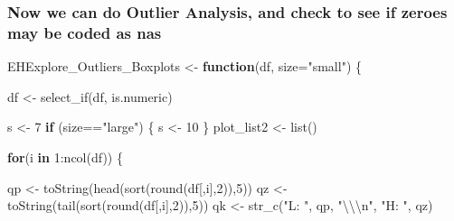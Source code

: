 \documentclass[
]{article}
\newenvironment{Shaded}{\begin{snugshade}}{\end{snugshade}}
\newcommand{\AttributeTok}[1]{\textcolor[rgb]{0.77,0.63,0.00}{#1}}
\newcommand{\ControlFlowTok}[1]{\textcolor[rgb]{0.13,0.29,0.53}{\textbf{#1}}}
\newcommand{\DecValTok}[1]{\textcolor[rgb]{0.00,0.00,0.81}{#1}}
\newcommand{\FunctionTok}[1]{\textcolor[rgb]{0.00,0.00,0.00}{#1}}
\newcommand{\NormalTok}[1]{#1}
\newcommand{\OtherTok}[1]{\textcolor[rgb]{0.56,0.35,0.01}{#1}}
\newcommand{\SpecialCharTok}[1]{\textcolor[rgb]{0.00,0.00,0.00}{#1}}
\newcommand{\StringTok}[1]{\textcolor[rgb]{0.31,0.60,0.02}{#1}}
\begin{document}
\hypertarget{now-we-can-do-outlier-analysis-and-check-to-see-if-zeroes-may-be-coded-as-nas}{%
\subsubsection{Now we can do Outlier Analysis, and check to see if
zeroes may be coded as
nas}\label{now-we-can-do-outlier-analysis-and-check-to-see-if-zeroes-may-be-coded-as-nas}}

\begin{Shaded}
\begin{Highlighting}[]
\NormalTok{EHExplore\_Outliers\_Boxplots }\OtherTok{\textless{}{-}} \ControlFlowTok{function}\NormalTok{(df, }\AttributeTok{size=}\StringTok{"small"}\NormalTok{)}
\NormalTok{\{}

\NormalTok{df }\OtherTok{\textless{}{-}} \FunctionTok{select\_if}\NormalTok{(df, is.numeric)}
  
\NormalTok{s }\OtherTok{\textless{}{-}} \DecValTok{7}
\ControlFlowTok{if}\NormalTok{ (size}\SpecialCharTok{==}\StringTok{"large"}\NormalTok{) \{}
\NormalTok{  s }\OtherTok{\textless{}{-}} \DecValTok{10}
\NormalTok{\}}
\NormalTok{plot\_list2 }\OtherTok{\textless{}{-}} \FunctionTok{list}\NormalTok{()}

\ControlFlowTok{for}\NormalTok{(i }\ControlFlowTok{in} \DecValTok{1}\SpecialCharTok{:}\FunctionTok{ncol}\NormalTok{(df)) \{     }
  
\NormalTok{  qp }\OtherTok{\textless{}{-}} \FunctionTok{toString}\NormalTok{(}\FunctionTok{head}\NormalTok{(}\FunctionTok{sort}\NormalTok{(}\FunctionTok{round}\NormalTok{(df[,i],}\DecValTok{2}\NormalTok{)),}\DecValTok{5}\NormalTok{))}
\NormalTok{  qz }\OtherTok{\textless{}{-}} \FunctionTok{toString}\NormalTok{(}\FunctionTok{tail}\NormalTok{(}\FunctionTok{sort}\NormalTok{(}\FunctionTok{round}\NormalTok{(df[,i],}\DecValTok{2}\NormalTok{)),}\DecValTok{5}\NormalTok{))}
\NormalTok{  qk }\OtherTok{\textless{}{-}} \FunctionTok{str\_c}\NormalTok{(}\StringTok{"L:   "}\NormalTok{, qp, }\StringTok{"}\SpecialCharTok{\textbackslash{}\textbackslash{}\textbackslash{}n}\StringTok{"}\NormalTok{, }\StringTok{"H:   "}\NormalTok{, qz)}
  

\end{Highlighting}
\end{Shaded}
\end{document}
